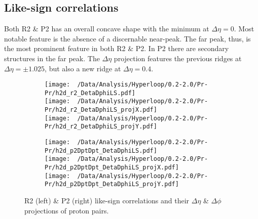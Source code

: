 \documentclass[12pt,a4paper,twoside]{report}
\begin{document}
\subsection{Like-sign correlations}
Both R2 \& P2 has an overall concave shape with the minimum at $\Delta\eta=0$. Most notable feature is the absence of a discernable near-peak. The far peak, thus, is the most prominent feature in both R2 \& P2. In P2 there are secondary structures in the far peak. The $\Delta\eta$ projection features the previous ridges at $\Delta\eta=\pm1.025$, but also a new ridge at $\Delta\eta=0.4$.
\begin{figure}[H]
	\begin{subfigure}{0.49\linewidth}
		\texttt{[image: ~/Data/Analysis/Hyperloop/0.2-2.0/Pr-Pr/h2d\_r2\_DetaDphiLS.pdf]}\\
		\texttt{[image: ~/Data/Analysis/Hyperloop/0.2-2.0/Pr-Pr/h2d\_r2\_DetaDphiLS\_projX.pdf]}\\
		\texttt{[image: ~/Data/Analysis/Hyperloop/0.2-2.0/Pr-Pr/h2d\_r2\_DetaDphiLS\_projY.pdf]}\\
	\end{subfigure}
	\begin{subfigure}{0.49\linewidth}
		\texttt{[image: ~/Data/Analysis/Hyperloop/0.2-2.0/Pr-Pr/h2d\_p2DptDpt\_DetaDphiLS.pdf]}\\
		\texttt{[image: ~/Data/Analysis/Hyperloop/0.2-2.0/Pr-Pr/h2d\_p2DptDpt\_DetaDphiLS\_projX.pdf]}\\
		\texttt{[image: ~/Data/Analysis/Hyperloop/0.2-2.0/Pr-Pr/h2d\_p2DptDpt\_DetaDphiLS\_projY.pdf]}\\
	\end{subfigure}
	\caption{R2 (left) \& P2 (right) like-sign correlations and their $\Delta\eta$ \& $\Delta\phi$ projections of proton pairs.}
\end{figure}
\end{document}
